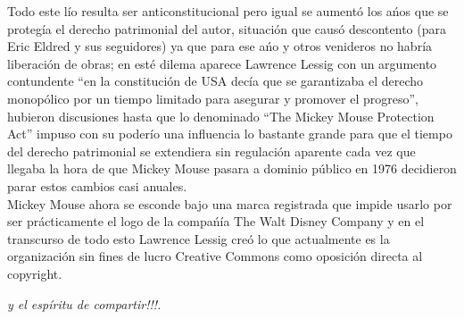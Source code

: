 \begin{multicols}{2}
Todo este lío resulta ser anticonstitucional pero igual se aumentó los ańos que se protegía el derecho patrimonial del autor, situación que causó descontento (para Eric Eldred y sus seguidores) ya que para ese ańo y otros venideros no habría liberación de obras; en esté dilema aparece Lawrence Lessig con un argumento contundente ``en la constitución de USA decía que se garantizaba el derecho monopólico por un tiempo limitado para asegurar y promover el progreso'', hubieron discusiones hasta que lo denominado ``The Mickey Mouse Protection Act''\cite {ref3} impuso con su poderío una influencia lo bastante grande para que el tiempo del derecho patrimonial se extendiera sin regulación aparente cada vez que llegaba la hora de que Mickey Mouse pasara a dominio público\cite {ref4} en 1976 decidieron parar estos cambios casi anuales. \\

Mickey Mouse ahora se esconde bajo una marca registrada que impide usarlo por ser prácticamente el logo de la compańía The Walt Disney Company y en el transcurso de todo esto Lawrence Lessig creó lo que actualmente es la organización sin fines de lucro Creative Commons como oposición directa al copyright.

\begin{entradilla} %
{\em {\color{introcolor}{Internet}} y el espíritu de compartir!!!.}
\end{entradilla}
\end{multicols}




\begin{center}
\end{center}

